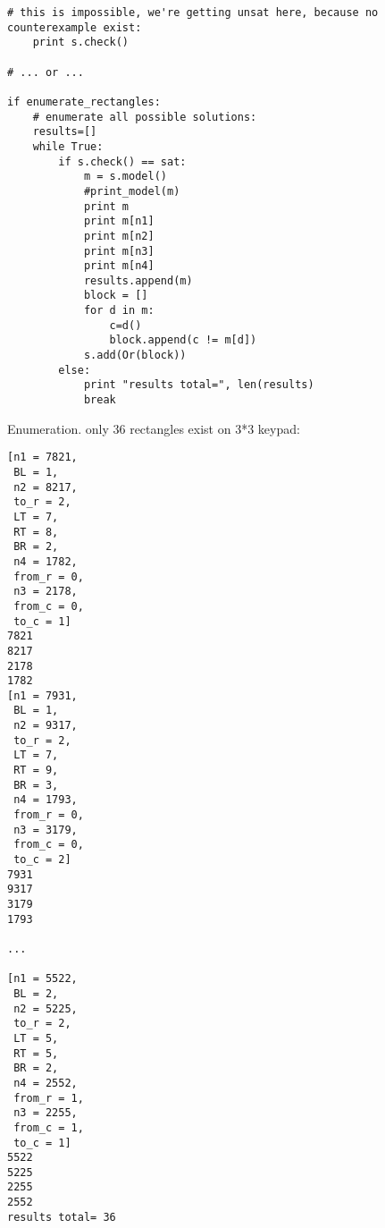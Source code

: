 \begin{lstlisting}[style=custompy]
    # this is impossible, we're getting unsat here, because no counterexample exist:
    print s.check()

# ... or ...

if enumerate_rectangles:
    # enumerate all possible solutions:
    results=[]
    while True:
        if s.check() == sat:
            m = s.model()
            #print_model(m)
            print m
            print m[n1]
            print m[n2]
            print m[n3]
            print m[n4]
            results.append(m)
            block = []
            for d in m:
                c=d()
                block.append(c != m[d])
            s.add(Or(block))
        else:
            print "results total=", len(results)
            break

\end{lstlisting}

Enumeration. only 36 rectangles exist on 3*3 keypad:

\begin{lstlisting}
[n1 = 7821,
 BL = 1,
 n2 = 8217,
 to_r = 2,
 LT = 7,
 RT = 8,
 BR = 2,
 n4 = 1782,
 from_r = 0,
 n3 = 2178,
 from_c = 0,
 to_c = 1]
7821
8217
2178
1782
[n1 = 7931,
 BL = 1,
 n2 = 9317,
 to_r = 2,
 LT = 7,
 RT = 9,
 BR = 3,
 n4 = 1793,
 from_r = 0,
 n3 = 3179,
 from_c = 0,
 to_c = 2]
7931
9317
3179
1793

...

[n1 = 5522,
 BL = 2,
 n2 = 5225,
 to_r = 2,
 LT = 5,
 RT = 5,
 BR = 2,
 n4 = 2552,
 from_r = 1,
 n3 = 2255,
 from_c = 1,
 to_c = 1]
5522
5225
2255
2552
results total= 36
\end{lstlisting}

